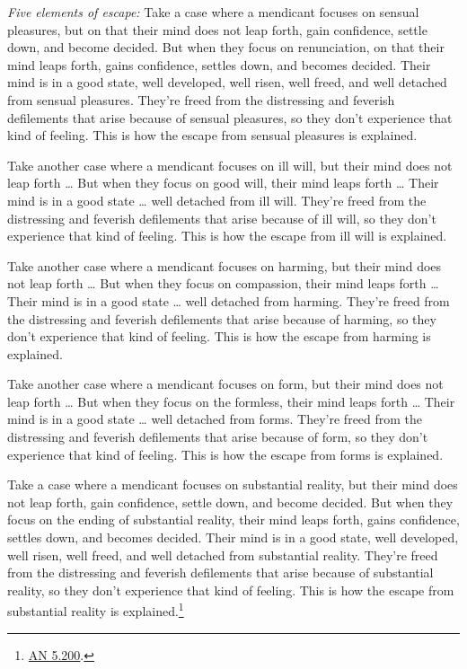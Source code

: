 \documentclass[12pt,openany]{book}%
\begin{document}
\emph{Five elements of escape:} Take a case where a mendicant focuses on sensual pleasures, but on that their mind does not leap forth, gain confidence, settle down, and become decided. But when they focus on renunciation, on that their mind leaps forth, gains confidence, settles down, and becomes decided. Their mind is in a good state, well developed, well risen, well freed, and well detached from sensual pleasures. They’re freed from the distressing and feverish defilements that arise because of sensual pleasures, so they don’t experience that kind of feeling. This is how the escape from sensual pleasures is explained. 

Take another case where a mendicant focuses on ill will, but their mind does not leap forth … But when they focus on good will, their mind leaps forth … Their mind is in a good state … well detached from ill will. They’re freed from the distressing and feverish defilements that arise because of ill will, so they don’t experience that kind of feeling. This is how the escape from ill will is explained. 

Take another case where a mendicant focuses on harming, but their mind does not leap forth … But when they focus on compassion, their mind leaps forth … Their mind is in a good state … well detached from harming. They’re freed from the distressing and feverish defilements that arise because of harming, so they don’t experience that kind of feeling. This is how the escape from harming is explained. 

Take another case where a mendicant focuses on form, but their mind does not leap forth … But when they focus on the formless, their mind leaps forth … Their mind is in a good state … well detached from forms. They’re freed from the distressing and feverish defilements that arise because of form, so they don’t experience that kind of feeling. This is how the escape from forms is explained. 

Take a case where a mendicant focuses on substantial reality, but their mind does not leap forth, gain confidence, settle down, and become decided. But when they focus on the ending of substantial reality, their mind leaps forth, gains confidence, settles down, and becomes decided. Their mind is in a good state, well developed, well risen, well freed, and well detached from substantial reality. They’re freed from the distressing and feverish defilements that arise because of substantial reality, so they don’t experience that kind of feeling. This is how the escape from substantial reality is explained.\footnote{\href{https://suttacentral.net/an5.200/en/sujato}{AN 5.200}. } 
\end{document}
